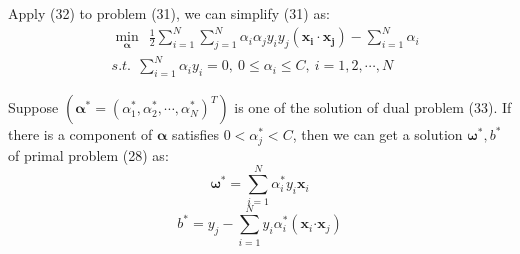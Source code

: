 Apply (32) to problem (31), we can simplify (31) as:
\begin{equation}
  \begin{split}
    &\min_{\bm\alpha}\ \ \frac{1}{2}\sum_{i=1}^{N}\sum_{j=1}^{N}\alpha_{i}\alpha_{j}y_{i}y_{j}(\bm{x_{i}}\cdot\bm{x_{j}})-\sum_{i=1}^{N}\alpha_{i}\\
    &s.t.\ \ \sum_{i=1}^{N}\alpha_{i}y_{i}=0,\ 0 \leqslant \alpha_{i} \leqslant C,\ i=1,2,\cdots,N
  \end{split}
\end{equation}

\begin{theorem}
  Suppose $(\bm\alpha^*=(\alpha_{1}^*,\alpha_{2}^*,\cdots,\alpha_{N}^*)^{T})$ is one of the solution of dual problem (33). If there is a component of $\bm\alpha$ satisfies $0<\alpha_{j}^*<C$, then we can get a solution $\bm\omega^*,b^*$ of primal problem (28) as:
  \begin{equation}
    \bm\omega^{*}=\sum_{i=1}^{N}\alpha_{i}^*y_{i}\bm x_{i}
  \end{equation}
  \begin{equation}
    b^*=y_{j}-\sum_{i=1}^{N}y_{i}\alpha_{i}^*(\bm x_{i}\bm\cdot\bm x_{j})
  \end{equation}
\end{theorem}

